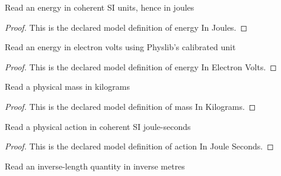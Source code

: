 \begin{definition}
  \label{def:physics:phyx-mini-0616:phyxminiproblems-problemphyxmini0616-energyinjoules}
  Read an energy in coherent SI units, hence in joules
\end{definition}
\begin{proof}
  This is the declared model definition of energy In Joules.
\end{proof}
\begin{definition}
  \label{def:physics:phyx-mini-0616:phyxminiproblems-problemphyxmini0616-energyinelectronvolts}
  Read an energy in electron volts using Physlib's calibrated unit
\end{definition}
\begin{proof}
  This is the declared model definition of energy In Electron Volts.
\end{proof}
\begin{definition}
  \label{def:physics:phyx-mini-0616:phyxminiproblems-problemphyxmini0616-massinkilograms}
  Read a physical mass in kilograms
\end{definition}
\begin{proof}
  This is the declared model definition of mass In Kilograms.
\end{proof}
\begin{definition}
  \label{def:physics:phyx-mini-0616:phyxminiproblems-problemphyxmini0616-actioninjouleseconds}
  Read a physical action in coherent SI joule-seconds
\end{definition}
\begin{proof}
  This is the declared model definition of action In Joule Seconds.
\end{proof}
\begin{definition}
  \label{def:physics:phyx-mini-0616:phyxminiproblems-problemphyxmini0616-inverselengthininversemeters}
  Read an inverse-length quantity in inverse metres
\end{definition}
